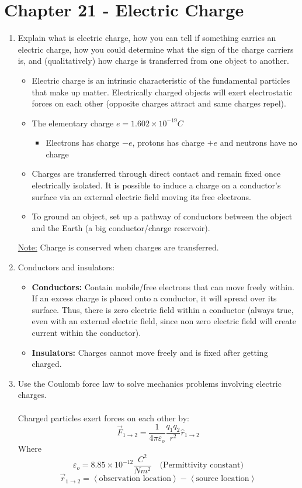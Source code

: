 \documentclass[12pt]{article}
\begin{document}
\section*{Chapter 21 - Electric Charge}
\begin{enumerate}
    \item Explain what is electric charge, how you can tell if something carries an electric charge, how you could determine what the sign of the charge carriers is, and (qualitatively) how charge is transferred from one object to another.
    \begin{itemize}
        \item Electric charge is an intrinsic characteristic of the fundamental particles that make up matter. Electrically charged objects will exert electrostatic forces on each other (opposite charges attract and same charges repel).
        \item The elementary charge $e = 1.602 \times 10^{-19}C$
        \begin{itemize}
            \item Electrons has charge $-e$, protons has charge $+e$ and neutrons have no charge
        \end{itemize}
        \item Charges are transferred through direct contact and remain fixed once electrically isolated. It is possible to induce a charge on a conductor's surface via an external electric field moving its free electrons.
        \item To ground an object, set up a pathway of conductors between the object and the Earth (a big conductor/charge reservoir).
    \end{itemize}
    \noindent\underline{Note:} Charge is conserved when charges are transferred.
    \item Conductors and insulators:
    \begin{itemize}
        \item \textbf{Conductors:} Contain mobile/free electrons that can move freely within. If an excess charge is placed onto a conductor, it will spread over its surface. Thus, there is zero electric field within a conductor (always true, even with an external electric field, since non zero electric field will create current within the conductor).
        \item \textbf{Insulators:} Charges cannot move freely and is fixed after getting charged.
    \end{itemize}
    \item Use the Coulomb force law to solve mechanics problems involving electric charges.\\\\
    Charged particles exert forces on each other by:
    \[\vec{F}_{1\to2}=\frac{1}{4\pi\varepsilon_o}\frac{q_1q_2}{r^2}\hat{r}_{1\to2}\]
    Where
    \[\varepsilon_o=8.85 \times 10^{-12} \frac{C^2}{Nm^2} \quad \text{(Permittivity constant)}\]
    \[\vec{r}_{1\to2}=\left<\text{observation location}\right>-\left<\text{source location}\right>\]
\end{enumerate}
\newpage
\end{document}
